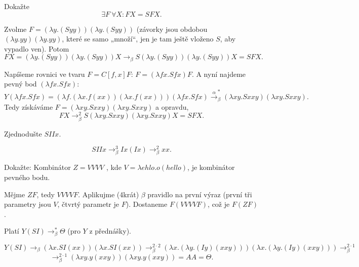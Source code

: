 \documentclass[12pt]{article}					%
\begin{document}
	\begin{priklad}[4d]
		Dokažte
		$$ \exists F\ \forall X: FX = SFX. $$

		\begin{dukazin}
			Zvolme $F = (λy.(Syy))(λy.(Syy))$ (závorky jsou obdobou $(λy.yy)(λy.yy)$, které se samo „množí“, jen je tam ještě vloženo $S$, aby vypadlo ven). Potom
			$$ FX = (λy.(Syy))(λy.(Syy))X \rightarrow_β S(λy.(Syy))(λy.(Syy))X = SFX. $$
		\end{dukazin}

		\begin{dukazin}
			Napíšeme rovnici ve tvaru $F = C[f, x]F$: $F = (λfx.Sfx)F$. A nyní najdeme pevný bod $(λfx.Sfx)$:
			$$ Y(λfx.Sfx) = (λf.(λx.f(xx))(λx.f(xx)))(λfx.Sfx) \overset{α}\rightarrow_β^* (λxy.Sxxy)(λxy.Sxxy). $$
			Tedy získáváme $F = (λxy.Sxxy)(λxy.Sxxy)$ a opravdu,
			$$ FX \rightarrow_β^2 S(λxy.Sxxy)(λxy.Sxxy)X = SFX. $$
		\end{dukazin}
	\end{priklad}

	\begin{priklad}[5a $SIIx$]
		Zjednodušte $SIIx$.

		\begin{reseni}
			$$ SIIx \rightarrow_β^3 Ix(Ix) \rightarrow_β^2 xx. $$
		\end{reseni}
	\end{priklad}

	\begin{priklad}[6b]
		Dokažte: Kombinátor $Z = V V V V$ , kde $V = λehlo.o(hello)$, je kombinátor pevného bodu.
		
		\begin{dukazin}
			Mějme $ZF$, tedy $VVVVF$. Aplikujme (4krát) $β$ pravidlo na první výraz (první tři parametry jsou $V$, čtvrtý parametr je $F$). Dostaneme $F(VVVVF)$, což je $F(ZF)$.
		\end{dukazin}
	\end{priklad}
\pagebreak
	\begin{priklad}[6c2]
		Platí $Y(SI) \rightarrow_β^* \Theta$ (pro $Y$ z přednášky).

		\begin{dukazin}[Ano.]
			$$ Y(S I) \rightarrow_β (λx.S I(xx))(λx.S I(xx)) \rightarrow_β^{2\cdot 2} (λx.(λy.(Iy)(xxy)))(λx.(λy.(Iy)(xxy))) \rightarrow_β^{2\cdot 1} $$
			$$ \rightarrow_β^{2\cdot 1} (λxy.y(xxy))(λxy.y(xxy)) = AA = \Theta. $$
		\end{dukazin}
	\end{priklad}
\end{document}
